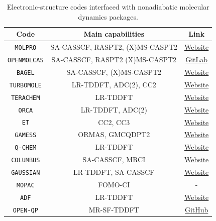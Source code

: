 \documentclass[9pt,bestpractices,pubversion]{livecoms}
\begin{document}
\begin{table}[h!]
    \centering
    \begin{tabular}{|c|c|c|}
    \hline 
    \textbf{Code}  & \textbf{Main capabilities} & \textbf{Link} \\ 
    \hline
        \texttt{MOLPRO}   & SA-CASSCF, RASPT2, (X)MS-CASPT2 & \href{https://www.molpro.net}{Website}  \\
        \texttt{OPENMOLCAS}   & SA-CASSCF, RASPT2 (X)MS-CASPT2 &  \href{https://gitlab.com/Molcas/OpenMolcas}{GitLab}  \\
        \texttt{BAGEL}   & SA-CASSCF, (X)MS-CASPT2  & \href{https://nubakery.org}{Website}  \\
        \texttt{TURBOMOLE}   & LR-TDDFT, ADC(2), CC2  &  \href{https://www.turbomole.org}{Website}  \\
        \texttt{TERACHEM}   & LR-TDDFT  & \href{http://www.petachem.com}{Website}  \\
        \texttt{ORCA}   & LR-TDDFT, ADC(2) & \href{https://www.faccts.de/orca/}{Website}  \\
        \texttt{ET}   & CC2, CC3 & \href{https://etprogram.org}{Website}  \\
        \texttt{GAMESS}  & ORMAS, GMCQDPT2 & \href{https://www.msg.chem.iastate.edu/gamess/}{Website} \\
        \texttt{Q-CHEM}  & LR-TDDFT & \href{https://www.q-chem.com}{Website}  \\
        \texttt{COLUMBUS}  & SA-CASSCF, MRCI  & \href{https://columbus-program-system.gitlab.io/columbus/}{Website}  \\
        \texttt{GAUSSIAN}  & LR-TDDFT, SA-CASSCF  & \href{https://gaussian.com}{Website}  \\
        \texttt{MOPAC}  & FOMO-CI & -  \\
        \texttt{ADF}  & LR-TDDFT & \href{https://www.scm.com/amsterdam-modeling-suite/adf/}{Website}  \\
        \texttt{OPEN-QP}  & MR-SF-TDDFT & \href{https://github.com/Open-Quantum-Platform/openqp}{GitHub} \\
      \hline
    \end{tabular}
    \caption{Electronic-structure codes interfaced with nonadiabatic molecular dynamics packages.}
    \label{tab:IC2}
\end{table}
\end{document}

